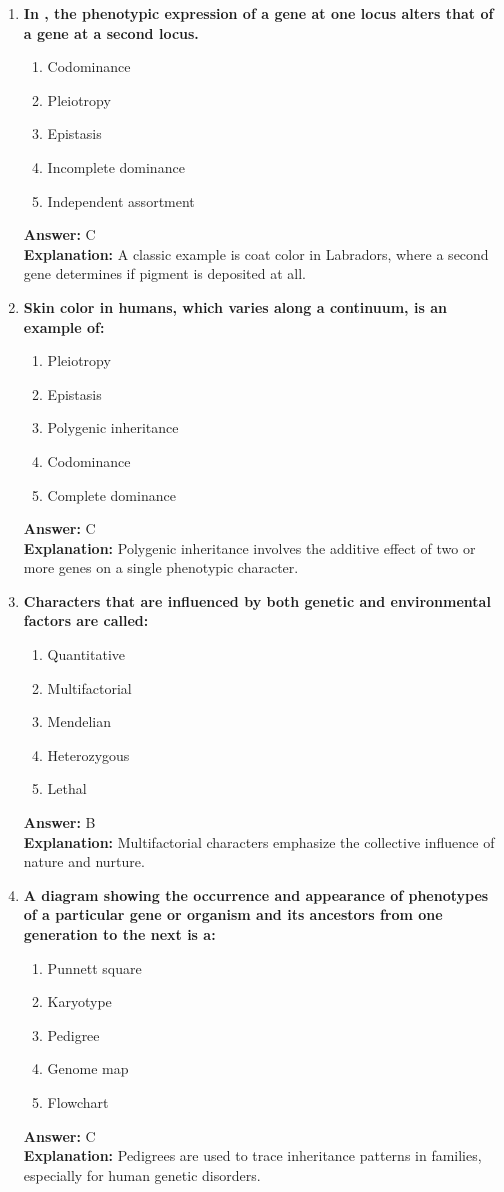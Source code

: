 \documentclass[11pt, a4paper]{article}
\begin{document}
\begin{enumerate}[leftmargin=*, label=\arabic*.]
\item \textbf{In \underline{\hspace{1cm}}, the phenotypic expression of a gene at one locus alters that of a gene at a second locus.}
\begin{enumerate}[label=\Alph*.]
\item Codominance
\item Pleiotropy
\item Epistasis
\item Incomplete dominance
\item Independent assortment
\end{enumerate}
\textbf{Answer:} C \\
\textbf{Explanation:} A classic example is coat color in Labradors, where a second gene determines if pigment is deposited at all.

\item \textbf{Skin color in humans, which varies along a continuum, is an example of:}
\begin{enumerate}[label=\Alph*.]
\item Pleiotropy
\item Epistasis
\item Polygenic inheritance
\item Codominance
\item Complete dominance
\end{enumerate}
\textbf{Answer:} C \\
\textbf{Explanation:} Polygenic inheritance involves the additive effect of two or more genes on a single phenotypic character.

\item \textbf{Characters that are influenced by both genetic and environmental factors are called:}
\begin{enumerate}[label=\Alph*.]
\item Quantitative
\item Multifactorial
\item Mendelian
\item Heterozygous
\item Lethal
\end{enumerate}
\textbf{Answer:} B \\
\textbf{Explanation:} Multifactorial characters emphasize the collective influence of nature and nurture.

\item \textbf{A diagram showing the occurrence and appearance of phenotypes of a particular gene or organism and its ancestors from one generation to the next is a:}
\begin{enumerate}[label=\Alph*.]
\item Punnett square
\item Karyotype
\item Pedigree
\item Genome map
\item Flowchart
\end{enumerate}
\textbf{Answer:} C \\
\textbf{Explanation:} Pedigrees are used to trace inheritance patterns in families, especially for human genetic disorders.


\end{enumerate}
\end{document}
